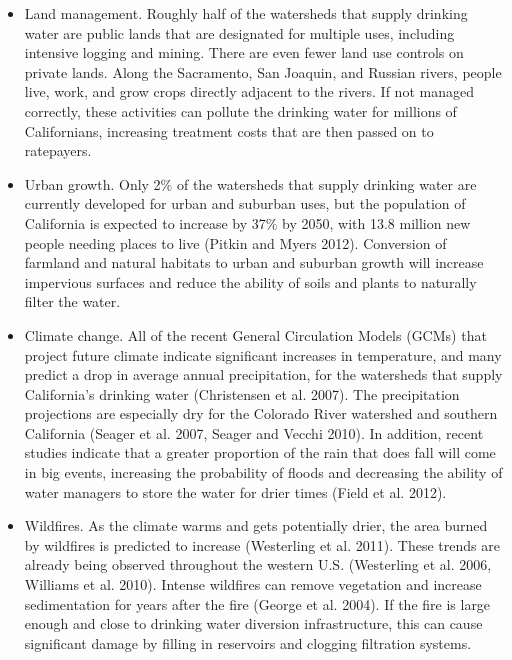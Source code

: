 \documentclass{article}
\begin{document}
\begin{itemize}
\item Land management. Roughly half of the watersheds that supply drinking water are public lands that are designated for multiple uses, including intensive logging and mining. There are even fewer land use controls on private lands. Along the Sacramento, San Joaquin, and Russian rivers, people live, work, and grow crops directly adjacent to the rivers. If not managed correctly, these activities can pollute the drinking water for millions of Californians, increasing treatment costs that are then passed on to ratepayers.
\item Urban growth. Only 2\% of the watersheds that supply drinking water are currently developed for urban and suburban uses, but the population of California is expected to increase by 37\% by 2050, with 13.8 million new people needing places to live (Pitkin and Myers 2012). Conversion of farmland and natural habitats to urban and suburban growth will increase impervious surfaces and reduce the ability of soils and plants to naturally filter the water.  
\item Climate change. All of the recent General Circulation Models (GCMs) that project future climate indicate significant increases in temperature, and many predict a drop in average annual precipitation, for the watersheds that supply California’s drinking water (Christensen et al. 2007). The precipitation projections are especially dry for the Colorado River watershed and southern California (Seager et al. 2007, Seager and Vecchi 2010). In addition, recent studies indicate that a greater proportion of the rain that does fall will come in big events, increasing the probability of floods and decreasing the ability of water managers to store the water for drier times (Field et al. 2012).
\item Wildfires. As the climate warms and gets potentially drier, the area burned by wildfires is predicted to increase (Westerling et al. 2011). These trends are already being observed throughout the western U.S. (Westerling et al. 2006, Williams et al. 2010).  Intense wildfires can remove vegetation and increase sedimentation for years after the fire (George et al. 2004). If the fire is large enough and close to drinking water diversion infrastructure, this can cause significant damage by filling in reservoirs and clogging filtration systems.
\end{itemize}
\end{document}
